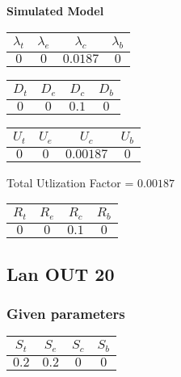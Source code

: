 \documentclass{article}
\begin{document}
\begin{minipage}{0.5\textwidth}
\centering	\textbf{Simulated Model}
\begin{table}[H]
\centering
\begin{tabular}{@{}cccc@{}}
\toprule
$\lambda_t$ & $\lambda_e$ & $\lambda_c$ & $\lambda_b$\\
\midrule
$0$ & $0$ & $0.0187$ & $0$\\
\bottomrule
\end{tabular}
\end{table}
\begin{table}[H]
\centering
\begin{tabular}{@{}cccc@{}}
\toprule
$D_t$ & $D_e$ & $D_c$ & $D_b$\\
\midrule
$0$ & $0$ & $0.1$ & $0$\\
\bottomrule
\end{tabular}
\end{table}\begin{table}[H]
\centering
\begin{tabular}{@{}cccc@{}}
\toprule
$U_t$ & $U_e$ & $U_c$ & $U_b$\\
\midrule
$0$ & $0$ & $0.00187$ & $0$\\
\bottomrule
\end{tabular}
\end{table}
\centering Total Utlization Factor = $0.00187$
\begin{table}[H]
\centering
\begin{tabular}{@{}cccc@{}}
\toprule
$R_t$ & $R_e$ & $R_c$ & $R_b$\\
\midrule
$0$ & $0$ & $0.1$ & $0$\\
\bottomrule
\end{tabular}
\end{table}
\end{minipage}\subsection{Lan OUT 20}
\subsubsection{Given parameters}
\begin{table}[H]
\centering
\begin{tabular}{@{}cccc@{}}
\toprule
$S_t$ & $S_e$ & $S_c$ & $S_b$\\
\midrule
$0.2$ & $0.2$ & $0$ & $0$\\
\bottomrule
\end{tabular}
\end{table}
\end{document}
